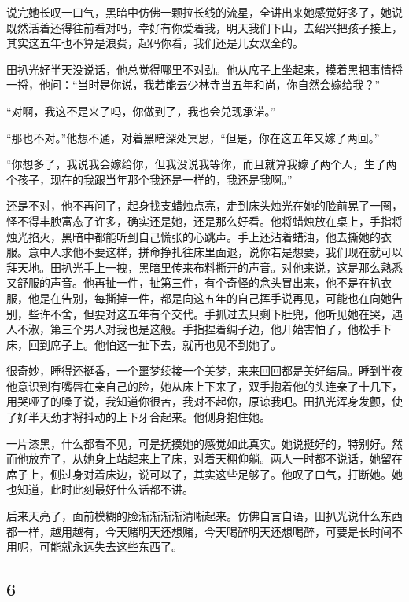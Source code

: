 说完她长叹一口气，黑暗中仿佛一颗拉长线的流星，全讲出来她感觉好多了，她说既然活着还得往前看对吗，幸好有你爱着我，明天我们下山，去绍兴把孩子接上，其实这五年也不算是浪费，起码你看，我们还是儿女双全的。

田扒光好半天没说话，他总觉得哪里不对劲。他从席子上坐起来，摸着黑把事情捋一捋，他问：“当时是你说，我若能去少林寺当五年和尚，你自然会嫁给我？”

“对啊，我这不是来了吗，你做到了，我也会兑现承诺。”

“那也不对。”他想不通，对着黑暗深处冥思，“但是，你在这五年又嫁了两回。”

“你想多了，我说我会嫁给你，但我没说我等你，而且就算我嫁了两个人，生了两个孩子，现在的我跟当年那个我还是一样的，我还是我啊。”

还是不对，他不再问了，起身找支蜡烛点亮，走到床头烛光在她的脸前晃了一圈，怪不得丰腴富态了许多，确实还是她，还是那么好看。他将蜡烛放在桌上，手指将烛光掐灭，黑暗中都能听到自己慌张的心跳声。手上还沾着蜡油，他去撕她的衣服。意中人求他不要这样，拼命挣扎往床里面退，说你若是想要，我们现在就可以拜天地。田扒光手上一拽，黑暗里传来布料撕开的声音。对他来说，这是那么熟悉又舒服的声音。他再扯一件，扯第三件，有个奇怪的念头冒出来，他不是在扒衣服，他是在告别，每撕掉一件，都是向这五年的自己挥手说再见，可能也在向她告别，些许不舍，但要对这五年有个交代。手抓过去只剩下肚兜，他听见她在哭，遇人不淑，第三个男人对我也是这般。手指捏着绸子边，他开始害怕了，他松手下床，回到席子上。他怕这一扯下去，就再也见不到她了。

很奇妙，睡得还挺香，一个噩梦续接一个美梦，来来回回都是美好结局。睡到半夜他意识到有嘴唇在亲自己的脸，她从床上下来了，双手抱着他的头连亲了十几下，用哭哑了的嗓子说，我知道你很苦，我对不起你，原谅我吧。田扒光浑身发颤，使了好半天劲才将抖动的上下牙合起来。他侧身抱住她。

一片漆黑，什么都看不见，可是抚摸她的感觉如此真实。她说挺好的，特别好。然而他放弃了，从她身上站起来上了床，对着天棚仰躺。两人一时都不说话，她留在席子上，侧过身对着床边，说可以了，其实这些足够了。他叹了口气，打断她。她也知道，此时此刻最好什么话都不讲。

后来天亮了，面前模糊的脸渐渐渐渐清晰起来。仿佛自言自语，田扒光说什么东西都一样，越用越有，今天赌明天还想赌，今天喝醉明天还想喝醉，可要是长时间不用呢，可能就永远失去这些东西了。
\newline

{\centering\subsection{6}}


